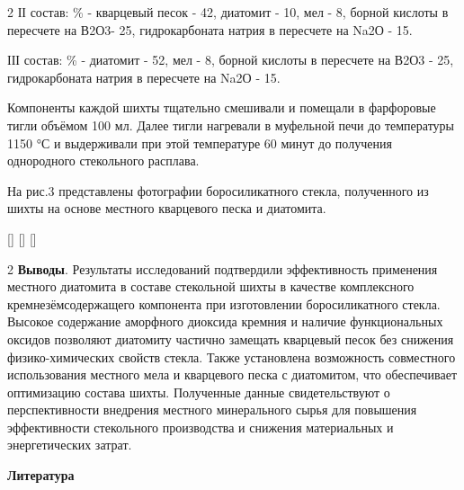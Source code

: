 \begin{multicols}{2}
ІІ состав: \% - кварцевый песок - 42, диатомит - 10, мел - 8, борной
кислоты в пересчете на В2О3- 25, гидрокарбоната натрия в пересчете на
Na2О - 15.

ІІІ состав: \% - диатомит - 52, мел - 8, борной кислоты в пересчете на
В2О3 - 25, гидрокарбоната натрия в пересчете на Na2О - 15.

Компоненты каждой шихты тщательно смешивали и помещали в фарфоровые
тигли объёмом 100 мл. Далее тигли нагревали в муфельной печи до
температуры 1150 °С и выдерживали при этой температуре 60 минут до
получения однородного стекольного расплава.

На рис.3 представлены фотографии боросиликатного стекла, полученного из
шихты на основе местного кварцевого песка и диатомита.
\end{multicols}
\vspace{-1em}
\begin{figs}
    []
    []
    []
\end{figs}

\begin{multicols}{2}
{\bfseries Выводы}. Результаты исследований подтвердили эффективность
применения местного диатомита в составе стекольной шихты в качестве
комплексного кремнезёмсодержащего компонента при изготовлении
боросиликатного стекла. Высокое содержание аморфного диоксида кремния и
наличие функциональных оксидов позволяют диатомиту частично замещать
кварцевый песок без снижения физико-химических свойств стекла. Также
установлена возможность совместного использования местного мела и
кварцевого песка с диатомитом, что обеспечивает оптимизацию состава
шихты. Полученные данные свидетельствуют о перспективности внедрения
местного минерального сырья для повышения эффективности стекольного
производства и снижения материальных и энергетических затрат.
\end{multicols}

\begin{center}
{\bfseries Литература}
\end{center}

